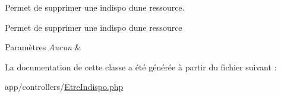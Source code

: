 Permet de supprimer une indispo d\textquotesingle{}une ressource. 

Permet de supprimer une indispo d\textquotesingle{}une ressource 
\begin{DoxyParams}{Paramètres}
{\em Aucun} & \\
\hline
\end{DoxyParams}


La documentation de cette classe a été générée à partir du fichier suivant \+:\begin{DoxyCompactItemize}
\item 
app/controllers/\hyperlink{_etre_indispo_8php}{Etre\+Indispo.\+php}\end{DoxyCompactItemize}
